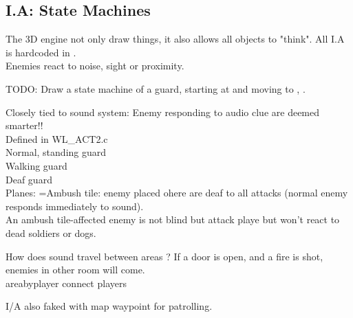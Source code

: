 \subsection{I.A: State Machines}
The 3D engine not only draw things, it also allows all objects to "think". All I.A is hardcoded in .\\ Enemies react to noise, sight or proximity.
\par
TODO: Draw a state machine of a guard, starting at  and moving to , .
\par
Closely tied to sound system: Enemy responding to audio clue are deemed smarter!!\\
Defined in WL\_ACT2.c\\
Normal, standing guard\\
Walking guard\\
Deaf guard\\

Planes:
=Ambush tile: enemy placed ohere are deaf to all attacks (normal enemy responds immediately to sound).\\
An ambush tile-affected enemy is not blind but attack playe but won't react to dead soldiers or dogs.\\
\par
How does sound travel between areas ? If a door is open, and a fire is shot, enemies in other room will come.\\
areabyplayer connect players\\
\par
I/A also faked with map waypoint for patrolling.\\



